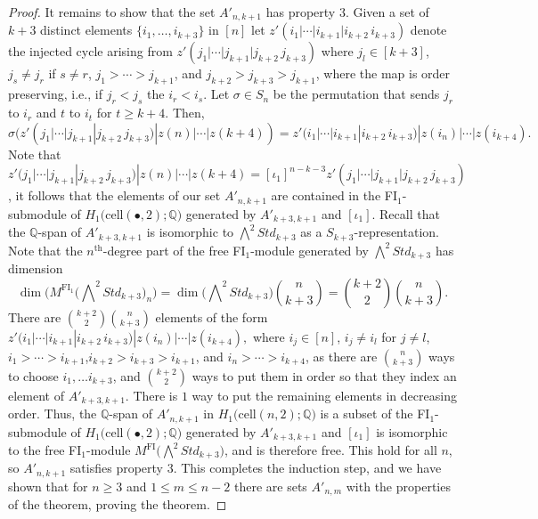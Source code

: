 \documentclass[12py]{amsart}%
\theoremstyle{definition}\newtheorem{definition}[thm]{Definition}
\theoremstyle{definition}
\newcommand{\Q}{\ensuremath{\mathbb{Q}}}
\begin{document}
\begin{proof}
It remains to show that the set $A'_{n,k+1}$ has property $3$. Given a set of $k+3$ distinct elements $\{i_{1}, \dots, i_{k+3}\}$ in $[n]$ let $z'(i_{1}|\cdots|i_{k+1}|i_{k+2}\,i_{k+3})$ denote the injected cycle arising from $z'(j_{1}|\cdots|j_{k+1}|j_{k+2}\,j_{k+3})$ where $j_{l}\in [k+3]$, $j_{s}\neq j_{r}$ if $s\neq r$, $j_{1}>\cdots>j_{k+1}$, and $j_{k+2}>j_{k+3}>j_{k+1}$, where the map is order preserving, i.e., if $j_{r}<j_{s}$ the $i_{r}<i_{s}$. Let $\sigma\in S_{n}$ be the permutation that sends $j_{r}$ to $i_{r}$ and $t$ to $i_{t}$ for $t\ge k+4$. Then,
\[
\sigma(z'(j_{1}|\cdots|j_{k+1}|j_{k+2}\,j_{k+3})|z(n)|\cdots|z(k+4))=z'(i_{1}|\cdots|i_{k+1}|i_{k+2}\,i_{k+3})|z(i_{n})|\cdots|z(i_{k+4}).
\]
Note that $z'(j_{1}|\cdots|j_{k+1}|j_{k+2}\,j_{k+3})|z(n)|\cdots|z(k+4)=[\iota_{1}]^{n-k-3}z'(j_{1}|\cdots|j_{k+1}|j_{k+2}\,j_{k+3})$, it follows that the elements of our set $A'_{n,k+1}$ are contained in the FI$_{1}$-submodule of $H_{1}\big(\text{cell}(\bullet, 2);\Q\big)$ generated by $A'_{k+3, k+1}$ and $[\iota_{1}]$. Recall that the $\Q$-span of $A'_{k+3,k+1}$ is isomorphic to $\bigwedge^{2}Std_{k+3}$ as a $S_{k+3}$-representation. Note that the $n^{\text{th}}$-degree part of the free FI$_{1}$-module generated by $\bigwedge^{2}Std_{k+3}$ has dimension
\[
\dim\bigg(M^{\text{FI}_{1}}\Big(\bigwedge\nolimits^{2}Std_{k+3}\Big)_{n}\bigg)=\dim\Big(\bigwedge\nolimits^{2}Std_{k+3}\Big)\binom{n}{k+3}=\binom{k+2}{2}\binom{n}{k+3}.
\]
There are $\binom{k+2}{2}\binom{n}{k+3}$ elements of the form $z'(i_{1}|\cdots|i_{k+1}|i_{k+2}\,i_{k+3})|z(i_{n})|\cdots|z(i_{k+4}),$ where $i_{j}\in [n]$, $i_{j}\neq i_{l}$ for $j\neq l$, $i_{1}>\cdots>i_{k+1}$,$i_{k+2}>i_{k+3}>i_{k+1}$, and $i_{n}>\cdots>i_{k+4}$, as there are $\binom{n}{k+3}$ ways to choose $i_{1},\dots i_{k+3}$, and $\binom{k+2}{2}$ ways to put them in order so that they index an element of $A'_{k+3,k+1}$. There is $1$ way to put the remaining elements in decreasing order. Thus, the $\Q$-span of $A'_{n, k+1}$ in $H_{1}\big(\text{cell}(n, 2);\Q\big)$ is a subset of the FI$_{1}$-submodule of $H_{1}\big(\text{cell}(\bullet, 2);\Q\big)$ generated by $A'_{k+3,k+1}$ and $[\iota_{1}]$ is isomorphic to the free FI$_{1}$-module $M^{\text{FI}}\Big(\bigwedge\nolimits^{2}Std_{k+3}\Big)$, and is therefore free. This hold for all $n$, so $A'_{n,k+1}$ satisfies property $3$. This completes the induction step, and we have shown that for $n\ge 3$ and $1\le m\le n-2$ there are sets $A'_{n,m}$ with the properties of the theorem, proving the theorem.
\end{proof}
\end{document}
